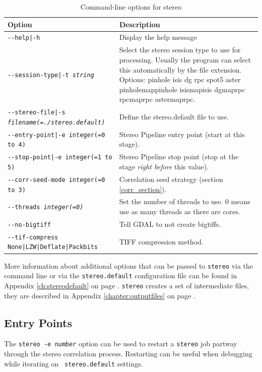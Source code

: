 \begin{longtable}{|l|p{7.5cm}|}
\caption{Command-line options for stereo}
\label{tbl:stereo}
\endfirsthead
\endhead
\endfoot
\endlastfoot
\hline
Option & Description \\ \hline \hline
\texttt{-\/-help|-h} & Display the help message\\ \hline
\texttt{-\/-session-type|-t \textit{string} } & Select the stereo session type to use for processing. Usually the program can select this automatically by the file extension. Options: pinhole isis dg rpc spot5 aster pinholemappinhole isismapisis dgmaprpc rpcmaprpc astermaprpc. \\ \hline
\texttt{-\/-stereo-file|-s \textit{filename(=./stereo.default)}} & Define the stereo.default file to use.\\ \hline
\texttt{-\/-entry-point|-e integer(=0 to 4)} & Stereo Pipeline entry
point (start at this stage). \\ \hline
\texttt{-\/-stop-point|-e integer(=1 to 5)} & Stereo Pipeline stop point (stop at the stage {\it right before} this value). \\ \hline
\texttt{-\/-corr-seed-mode integer(=0 to 3)} & Correlation seed strategy (section \ref{corr_section}). \\ \hline
\texttt{-\/-threads \textit{integer(=0)}} & Set the number of threads to use. 0 means use as many threads as there are cores.\\ \hline
\texttt{-\/-no-bigtiff} & Tell GDAL to not create bigtiffs.\\ \hline
\texttt{-\/-tif-compress None|LZW|Deflate|Packbits} & TIFF compression method.\\ \hline
\end{longtable}

More information about additional options that can be passed to \texttt{stereo}
via the command line or via the \texttt{stereo.default} configuration file can be
found in Appendix \ref{ch:stereodefault} on page
\pageref{ch:stereodefault}.  \texttt{stereo} creates a set
of intermediate files, they are described in Appendix
\ref{chapter:outputfiles} on page \pageref{chapter:outputfiles}.

\subsection{Entry Points}
\label{entrypoints}

The \texttt{stereo -e \textit{number}} option can be used to restart
a {\tt stereo} job partway through the stereo correlation process.
Restarting can be useful when debugging while iterating on {\tt
stereo.default} settings.

